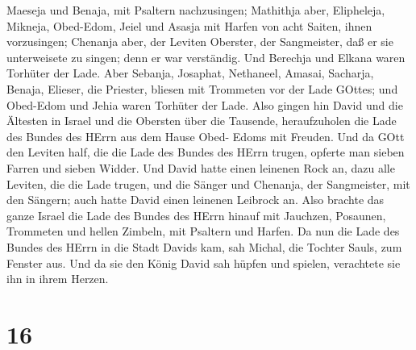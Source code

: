 Maeseja und Benaja, mit Psaltern nachzusingen;  Mathithja
aber, Elipheleja, Mikneja, Obed-Edom, Jeiel und Asasja mit Harfen von
acht Saiten, ihnen vorzusingen;  Chenanja aber, der Leviten
Oberster, der Sangmeister, daß er sie unterweisete zu singen; denn er
war verständig.  Und Berechja und Elkana waren Torhüter der
Lade.  Aber Sebanja, Josaphat, Nethaneel, Amasai, Sacharja,
Benaja, Elieser, die Priester, bliesen mit Trommeten vor der Lade
GOttes; und Obed-Edom und Jehia waren Torhüter der Lade. 
Also gingen hin David und die Ältesten in Israel und die Obersten über
die Tausende, heraufzuholen die Lade des Bundes des HErrn aus dem Hause
Obed- Edoms mit Freuden.  Und da GOtt den Leviten half, die
die Lade des Bundes des HErrn trugen, opferte man sieben Farren und
sieben Widder.  Und David hatte einen leinenen Rock an,
dazu alle Leviten, die die Lade trugen, und die Sänger und Chenanja, der
Sangmeister, mit den Sängern; auch hatte David einen leinenen Leibrock
an.  Also brachte das ganze Israel die Lade des Bundes des
HErrn hinauf mit Jauchzen, Posaunen, Trommeten und hellen Zimbeln, mit
Psaltern und Harfen.  Da nun die Lade des Bundes des HErrn
in die Stadt Davids kam, sah Michal, die Tochter Sauls, zum Fenster aus.
Und da sie den König David sah hüpfen und spielen, verachtete sie ihn in
ihrem Herzen.

\hypertarget{section-15}{%
\section{16}\label{section-15}}

